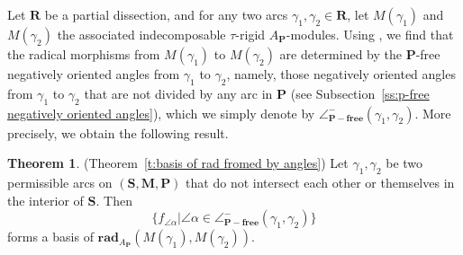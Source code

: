 \documentclass[a4paper,10pt]{amsart}
\theoremstyle{plain}          %
\theoremstyle{definition}
\newtheorem{thm}[theorem]{Theorem}
\def\SS{\mathbf{S}}
\def\RR{\mathbf{R}}
\def\MM{\mathbf{M}}
\def\PP{\mathbf{P}}
\def\MM{\mathbf{M}}
\newcommand{\apfree}{\angle^-_{\mathbf{P-free}}}
\begin{document}
Let $\RR$ be a partial dissection, and
for any two arcs $\gamma_1,\gamma_2\in \RR$, let $M(\gamma_1)$ and $M(\gamma_2)$ the associated indecomposable $\tau$-rigid $A_\PP$-modules. Using \cite[Proposition 3.19]{BS}, we find that the radical morphisms from  $M(\gamma_1)$ to $M(\gamma_2)$
are determined by the $\PP$-free negatively oriented angles from $\gamma_1$ to $\gamma_2$,  namely, those negatively oriented angles from $\gamma_1$ to $\gamma_2$ that are not divided by any arc in $\PP$ (see Subsection~\ref{ss:p-free negatively oriented angles}), which we simply denote by $\apfree(\gamma_1,\gamma_2)$. More precisely, we obtain the following result.
\begin{thm}\label{t:main resuls 1}(Theorem~\ref{t:basis of rad fromed by angles})
Let $\gamma_1,\gamma_2$ be two  permissible arcs on $(\SS,\MM,\PP)$ that do not intersect each other or themselves in the interior of $\SS$. Then 
$$\{f_{\angle\alpha}|\angle\alpha\in \apfree(\gamma_1,\gamma_2)\}$$
forms a basis of $\mathbf{rad}_{A_\PP}(M(\gamma_1),M(\gamma_2))$.
\end{thm}





\end{document}
